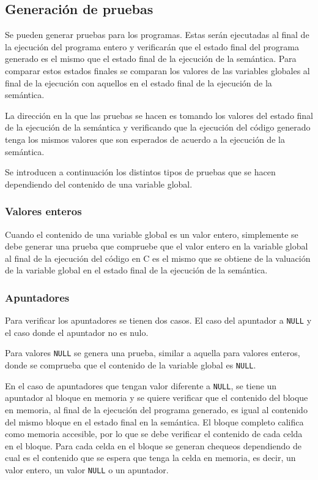 \subsection{Generación de pruebas}

Se pueden generar pruebas para los programas.
Estas serán ejecutadas al final de la ejecución del programa entero y verificarán que el estado final del programa generado es el mismo que el estado final de la ejecución de la semántica.
Para comparar estos estados finales se comparan los valores de las variables globales al final de la ejecución con aquellos en el estado final de la ejecución de la semántica.

La dirección en la que las pruebas se hacen es tomando los valores del estado final de la ejecución de la semántica y verificando que la ejecución del código generado tenga los mismos valores que son esperados de acuerdo a la ejecución de la semántica.

Se introducen a continuación los distintos tipos de pruebas que se hacen dependiendo del contenido de una variable global.

\subsubsection*{Valores enteros}

Cuando el contenido de una variable global es un valor entero, simplemente se debe generar una prueba que compruebe que el valor entero en la variable global al final de la ejecución del código en C es el mismo que se obtiene de la valuación de la variable global en el estado final de la ejecución de la semántica.

\subsubsection*{Apuntadores}

Para verificar los apuntadores se tienen dos casos.
El caso del apuntador a \verb|NULL| y el caso donde el apuntador no es nulo.

Para valores \verb|NULL| se genera una prueba, similar a aquella para valores enteros, donde se comprueba que el contenido de la variable global es \verb|NULL|.

En el caso de apuntadores que tengan valor diferente a \verb|NULL|, se tiene un apuntador al bloque en memoria y se quiere verificar que el contenido del bloque en memoria, al final de la ejecución del programa generado, es igual al contenido del mismo bloque en el estado final en la semántica.
El bloque completo califica como memoria accesible, por lo que se debe verificar el contenido de cada celda en el bloque.
Para cada celda en el bloque se generan chequeos dependiendo de cual es el contenido que se espera que tenga la celda en memoria, es decir, un valor entero, un valor \verb|NULL| o un apuntador.

